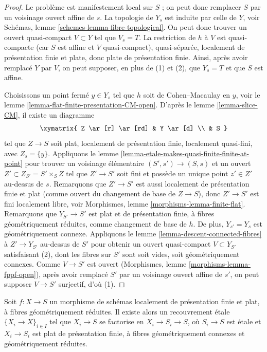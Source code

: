 \begin{proof}
Le problème est manifestement local sur $S$ ; on peut donc remplacer $S$ par un
voisinage ouvert affine de $s$.
La topologie de $Y_s$ est induite par celle de $Y$, voir
Schémas, lemme \ref{schemes-lemma-fibre-topological}.
On peut donc trouver un ouvert quasi-compact $V \subset Y$ tel que $V_s = T$.
La restriction de $h$ à $V$ est quasi-compacte (car $S$ est affine et $V$
quasi-compact), quasi-séparée, localement de présentation finie et
plate, donc plate de présentation finie.
Ainsi, après avoir remplacé $Y$ par $V$, on peut supposer, en plus
de (1) et (2), que $Y_s = T$ et que $S$ est affine.

\medskip\noindent
Choisissons un point fermé $y \in Y_s$ tel que $h$ soit de Cohen--Macaulay en $y$, voir
le lemme \ref{lemma-flat-finite-presentation-CM-open}.
D'après le
lemme \ref{lemma-slice-CM},
il existe un diagramme
$$
\xymatrix{
Z \ar[r] \ar[rd] & Y \ar[d] \\
& S
}
$$
tel que $Z \to S$ soit plat, localement de présentation finie, localement
quasi-fini, avec $Z_s = \{y\}$. Appliquons le
lemme \ref{lemma-etale-makes-quasi-finite-finite-at-point}
pour trouver un voisinage élémentaire $(S', s') \to (S, s)$ et un ouvert
$Z' \subset Z_{S'} = S' \times_S Z$ tel que $Z' \to S'$ soit fini et possède un unique
point $z' \in Z'$ au-dessus de $s$. Remarquons que $Z' \to S'$ est aussi
localement de présentation finie et plat (comme ouvert du changement de base
de $Z \to S$), donc $Z' \to S'$ est fini localement libre, voir
Morphismes, lemme \ref{morphisms-lemma-finite-flat}.
Remarquons que $Y_{S'} \to S'$ est plat et de présentation finie,
à fibres géométriquement réduites, comme changement de base de $h$.
De plus, $Y_{s'} = Y_s$ est géométriquement connexe.
Appliquons le lemme \ref{lemma-descent-connected-fibres}
à $Z' \to Y_{S'}$ au-dessus de $S'$ pour obtenir un ouvert quasi-compact $V \subset Y_{S'}$
satisfaisant (2), dont les fibres sur $S'$ sont soit vides, soit
géométriquement connexes. Comme $V \to S'$ est ouvert
(Morphismes, lemme \ref{morphisms-lemma-fppf-open}), après avoir remplacé
$S'$ par un voisinage ouvert affine de $s'$,
on peut supposer $V \to S'$ surjectif, d'où (1).
\end{proof}

\begin{lemma}
\label{lemma-cover-by-geometrically-connected}
Soit $f : X \to S$ un morphisme de schémas
localement de présentation finie et plat, à fibres géométriquement
réduites. Il existe alors
un recouvrement \'etale $\{X_i \to X\}_{i \in I}$
tel que $X_i \to S$ se factorise en $X_i \to S_i \to S$,
où $S_i \to S$ est \'etale et $X_i \to S_i$ est
plat de présentation finie, à fibres géométriquement connexes
et géométriquement réduites.
\end{lemma}

